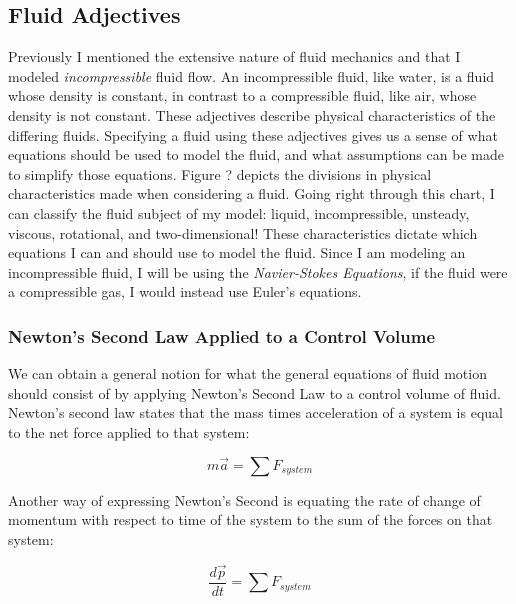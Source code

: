 \documentclass[twocolumn,12pth]{article}
\begin{document}
\subsection{Fluid Adjectives}

Previously I mentioned the extensive nature of fluid mechanics and that I modeled \textit{incompressible} fluid flow.
An incompressible fluid, like water, is a fluid whose density is constant, in contrast to a compressible fluid, like air, whose density is not constant.
These adjectives describe physical characteristics of the differing fluids.
Specifying a fluid using these adjectives gives us a sense of what equations should be used to model the fluid, and what assumptions can be made to simplify those equations.
Figure ? depicts the divisions in physical characteristics made when considering a fluid.
Going right through this chart, I can classify the fluid subject of my model: liquid, incompressible, unsteady, viscous, rotational, and two-dimensional!
These characteristics dictate which equations I can and should use to model the fluid.
Since I am modeling an incompressible fluid, I will be using the \textit{Navier-Stokes Equations}, if the fluid were a compressible gas, I would instead use Euler's equations.

\subsubsection{Newton's Second Law Applied to a Control Volume}

We can obtain a general notion for what the general equations of fluid motion should consist of by applying Newton's Second Law to a control volume of fluid.
Newton's second law states that the mass times acceleration of a system is equal to the net force applied to that system:

\begin{equation*}
m\vec{a} = \sum{F_{system}}
\end{equation*}

Another way of expressing Newton's Second is equating the rate of change of momentum with respect to time of the system to the sum of the forces on that system:

\begin{equation}
\frac{d{\vec{p}}}{dt} = \sum F_{system}
\end{equation}
\end{document}
